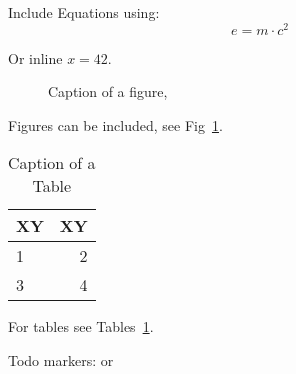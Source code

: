 \documentclass{expose} %
\begin{document}
Include Equations using:
\[ e = m \cdot c^2 \]

Or inline $x=42$.

\begin{figure}[tbh!]
\centering
\caption{Caption of a figure, }
\label{pic::example1}
\end{figure}
Figures can be included, see Fig~\ref{pic::example1}.


\begin{table}[h]
\centering
\caption{Caption of a Table}
\label{tbl::example1}
\begin{tabular}{lr}
\toprule
\textbf{XY}  & \textbf{XY} \\
\midrule
1   & 2 \\
\midrule
3 & 4 \\
\bottomrule
\end{tabular}
\end{table}

For tables see Tables~\ref{tbl::example1}.

Todo markers: 
or 



\printbibliography

\clearpage

\end{document}
